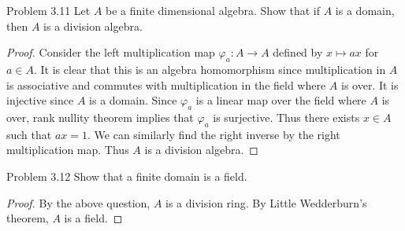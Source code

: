 \documentclass[a4paper]{article}
\begin{document}
\begin{ex}{Problem 3.11}{} Let $A$ be a finite dimensional algebra. Show that if $A$ is a domain, then $A$ is a division algebra. 
\begin{proof}
Consider the left multiplication map $\varphi_a:A\to A$ defined by $x\mapsto ax$ for $a\in A$. It is clear that this is an algebra homomorphism since multiplication in $A$ is associative and commutes with multiplication in the field where $A$ is over. It is injective since $A$ is a domain. Since $\varphi_a$ is a linear map over the field where $A$ is over, rank nullity theorem implies that $\varphi_a$ is surjective. Thus there exists $x\in A$ such that $ax=1$. We can similarly find the right inverse by the right multiplication map. Thus $A$ is a division algebra. 
\end{proof}
\end{ex}

\begin{ex}{Problem 3.12}{} Show that a finite domain is a field. 
\begin{proof}
By the above question, $A$ is a division ring. By Little Wedderburn's theorem, $A$ is a field. 
\end{proof}
\end{ex}
\end{document}
